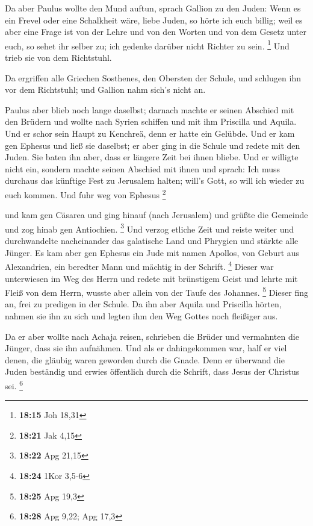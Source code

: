  Da aber Paulus wollte den Mund auftun, sprach Gallion zu
den Juden: Wenn es ein Frevel oder eine Schalkheit wäre, liebe Juden, so
hörte ich euch billig;  weil es aber eine Frage ist von der
Lehre und von den Worten und von dem Gesetz unter euch, so sehet ihr
selber zu; ich gedenke darüber nicht Richter zu sein. \footnote{\textbf{18:15}
  Joh 18,31}  Und trieb sie von dem Richtstuhl.

 Da ergriffen alle Griechen Sosthenes, den Obersten der
Schule, und schlugen ihn vor dem Richtstuhl; und Gallion nahm sich's
nicht an.

 Paulus aber blieb noch lange daselbst; darnach machte er
seinen Abschied mit den Brüdern und wollte nach Syrien schiffen und mit
ihm Priscilla und Aquila. Und er schor sein Haupt zu Kenchreä, denn er
hatte ein Gelübde.  Und er kam gen Ephesus und ließ sie
daselbst; er aber ging in die Schule und redete mit den Juden.
 Sie baten ihn aber, dass er längere Zeit bei ihnen bliebe.
Und er willigte nicht ein,  sondern machte seinen Abschied
mit ihnen und sprach: Ich muss durchaus das künftige Fest zu Jerusalem
halten; will's Gott, so will ich wieder zu euch kommen. Und fuhr weg von
Ephesus \footnote{\textbf{18:21} Jak 4,15}

 und kam gen Cäsarea und ging hinauf (nach Jerusalem) und
grüßte die Gemeinde und zog hinab gen Antiochien. \footnote{\textbf{18:22}
  Apg 21,15}  Und verzog etliche Zeit und reiste weiter und
durchwandelte nacheinander das galatische Land und Phrygien und stärkte
alle Jünger.  Es kam aber gen Ephesus ein Jude mit namen
Apollos, von Geburt aus Alexandrien, ein beredter Mann und mächtig in
der Schrift. \footnote{\textbf{18:24} 1Kor 3,5-6}  Dieser
war unterwiesen im Weg des Herrn und redete mit brünstigem Geist und
lehrte mit Fleiß von dem Herrn, wusste aber allein von der Taufe des
Johannes. \footnote{\textbf{18:25} Apg 19,3}  Dieser fing
an, frei zu predigen in der Schule. Da ihn aber Aquila und Priscilla
hörten, nahmen sie ihn zu sich und legten ihm den Weg Gottes noch
fleißiger aus.

 Da er aber wollte nach Achaja reisen, schrieben die Brüder
und vermahnten die Jünger, dass sie ihn aufnähmen. Und als er
dahingekommen war, half er viel denen, die gläubig waren geworden durch
die Gnade.  Denn er überwand die Juden beständig und erwies
öffentlich durch die Schrift, dass Jesus der Christus sei. \footnote{\textbf{18:28}
  Apg 9,22; Apg 17,3}

